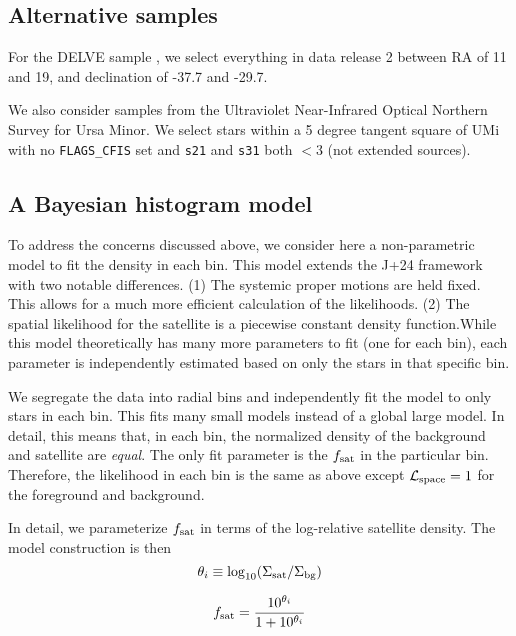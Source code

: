 \subsection{Alternative samples}\label{alternative-samples}

For the DELVE sample \citep{drlica-wagner+2022}, we select everything in
data release 2 between RA of 11 and 19, and declination of -37.7 and
-29.7.

We also consider samples from the Ultraviolet Near-Infrared Optical
Northern Survey \citep[UNIONS][]{gwyn+2025} for Ursa Minor. We select
stars within a 5 degree tangent square of UMi with no
\texttt{FLAGS\_CFIS} set and \texttt{s21} and \texttt{s31} both \(<3\)
(not extended sources).

\subsection{A Bayesian histogram
model}\label{a-bayesian-histogram-model}

To address the concerns discussed above, we consider here a
non-parametric model to fit the density in each bin. This model extends
the J+24 framework with two notable differences. (1) The systemic proper
motions are held fixed. This allows for a much more efficient
calculation of the likelihoods. (2) The spatial likelihood for the
satellite is a piecewise constant density function.While this model
theoretically has many more parameters to fit (one for each bin), each
parameter is independently estimated based on only the stars in that
specific bin.

We segregate the data into radial bins and independently fit the model
to only stars in each bin. This fits many small models instead of a
global large model. In detail, this means that, in each bin, the
normalized density of the background and satellite are \emph{equal}. The
only fit parameter is the \(f_{\rm sat}\) in the particular bin.
Therefore, the likelihood in each bin is the same as above except
\({\cal L}_{\rm space} = 1\) for the foreground and background.

In detail, we parameterize \(f_{\rm sat}\) in terms of the log-relative
satellite density. The model construction is then \begin{equation}{
\theta_i \equiv \log_{10}({\Sigma_{\rm sat}}/{\Sigma_{\rm bg}})
}\end{equation}

\begin{equation}{
f_{\rm sat} = \frac{10^{\theta_i}}{1 + 10^{\theta_i}}
}\end{equation}

